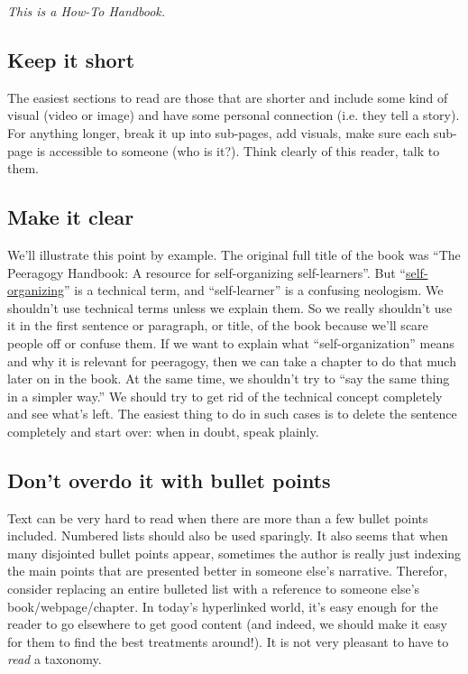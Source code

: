 {\centering\emph{This is a How-To Handbook.}\par}

\subsection{Keep it short}

The easiest sections to read are those that are shorter and include some
kind of visual (video or image) and have some personal connection (i.e.
they tell a story). For anything longer, break it up into sub-pages, add
visuals, make sure each sub-page is accessible to someone (who is it?).
Think clearly of this reader, talk to them.

\subsection{Make it clear}

We'll illustrate this point by example. The original full title of the
book was ``The Peeragogy Handbook: A resource for self-organizing
self-learners''. But
``\href{http://en.wikipedia.org/wiki/Self-organization}{self-organizing}''
is a technical term, and ``self-learner'' is a confusing neologism. We
shouldn't use technical terms unless we explain them. So we really
shouldn't use it in the first sentence or paragraph, or title, of the
book because we'll scare people off or confuse them. If we want to
explain what ``self-organization'' means and why it is relevant for
peeragogy, then we can take a chapter to do that much later on in the
book. At the same time, we shouldn't try to ``say the same thing in a
simpler way.'' We should try to get rid of the technical concept
completely and see what's left. The easiest thing to do in such cases is
to delete the sentence completely and start over: when in doubt, speak
plainly.

\subsection{Don't overdo it with bullet points}

Text can be very hard to read when there are more than a few bullet
points included. Numbered lists should also be used sparingly. It also
seems that when many disjointed bullet points appear, sometimes the
author is really just indexing the main points that are presented better
in someone else's narrative. Therefor, consider replacing an entire
bulleted list with a reference to someone else's book/webpage/chapter.
In today's hyperlinked world, it's easy enough for the reader to go
elsewhere to get good content (and indeed, we should make it easy for
them to find the best treatments around!). It is not very pleasant to
have to \emph{read} a taxonomy.

